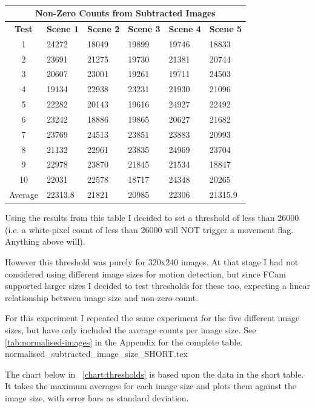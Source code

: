 \documentclass[11pt]{article} %
\begin{document}
{{\begin{center}
\begin{table}[!htbp]
\begin{tabular}{| c | l | l | l | l | l | }
\hline
\multicolumn{6}{|c|}{\bf Non-Zero Counts from Subtracted Images} \\
\hline
\bf Test	&\bf Scene 1	&\bf Scene 2	&\bf Scene 3	&\bf Scene 4	&\bf Scene 5	\\ \hline
1	&24272	&18049	&19899	&19746	&18833\\
2	&23691	&21275	&19730	&21381	&20744\\
3	&20607	&23001	&19261	&19711	&24503\\
4	&19134	&22938	&23231	&21930	&21096\\
5	&22282	&20143	&19616	&24927	&22492\\
6	&23242	&18886	&19865	&20627	&21682\\
7	&23769	&24513	&23851	&23883	&20993\\
8	&21132	&22961	&23835	&24969	&23704\\
9	&22978	&23870	&21845	&21534	&18847\\
10	&22031	&22578	&18717	&24348	&20265\\ \hline
Average	&22313.8	&21821	&20985	&22306	&21315.9	\\ \hline
	\end{tabular}
\caption{}
\vspace{-8pt}
\label{tab:sub2}
\end{table}
\vspace{-20pt}
\end{center}
Using the results from this table I decided to set a threshold of less than 26000 (i.e. a white-pixel count of less than 26000 will NOT trigger a movement flag. Anything above will). 

However this threshold was purely for 320x240 images. At that stage I had not considered using different image sizes  for motion detection, but since FCam supported larger sizes I decided to test thresholds for these too, expecting a linear relationship between image size and non-zero count.

For this experiment I repeated the same experiment for the five different image sizes, but have only included the average counts per image size. See \ref{tab:normalised-images} in the Appendix for the complete table.\\

{normalised_subtracted_image_size_SHORT.tex}

The chart below in ~\cref{chart:thresholds} is based upon the data in the short table. It takes the maximum averages for each image size and plots them against the image size, with error bars as standard deviation.\\

}}
\end{document}
